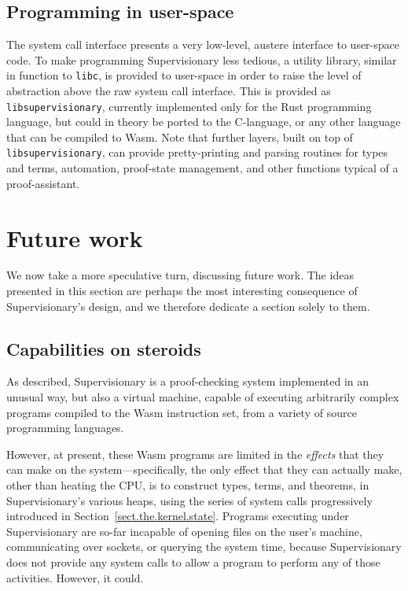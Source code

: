\documentclass[a4paper, UKenglish, cleveref, autoref, thm-restate, colorlinks]{lipics-v2021}
\begin{document}
\subsection{Programming in user-space}

The system call interface presents a very low-level, austere interface to user-space code.
To make programming Supervisionary less tedious, a utility library, similar in function to \texttt{libc}, is provided to user-space in order to raise the level of abstraction above the raw system call interface.
This is provided as \texttt{libsupervisionary}, currently implemented only for the Rust programming language, but could in theory be ported to the C-language, or any other language that can be compiled to Wasm.
Note that further layers, built on top of \texttt{libsupervisionary}, can provide pretty-printing and parsing routines for types and terms, automation, proof-state management, and other functions typical of a proof-assistant.

\section{Future work}
\label{sect.future.work}

We now take a more speculative turn, discussing future work.
The ideas presented in this section are perhaps the most interesting consequence of Supervisionary's design, and we therefore dedicate a section solely to them.

\subsection{Capabilities on steroids}
\label{subsect.capabilities.on.steroids}

As described, Supervisionary is a proof-checking system implemented in an unusual way, but also a virtual machine, capable of executing arbitrarily complex programs compiled to the Wasm instruction set, from a variety of source programming languages.

However, at present, these Wasm programs are limited in the \emph{effects} that they can make on the system---specifically, the only effect that they can actually make, other than heating the CPU, is to construct types, terms, and theorems, in Supervisionary's various heaps, using the series of system calls progressively introduced in Section~\ref{sect.the.kernel.state}.
Programs executing under Supervisionary are so-far incapable of opening files on the user's machine, communicating over sockets, or querying the system time, because Supervisionary does not provide any system calls to allow a program to perform any of those activities.
However, it could.
\end{document}
